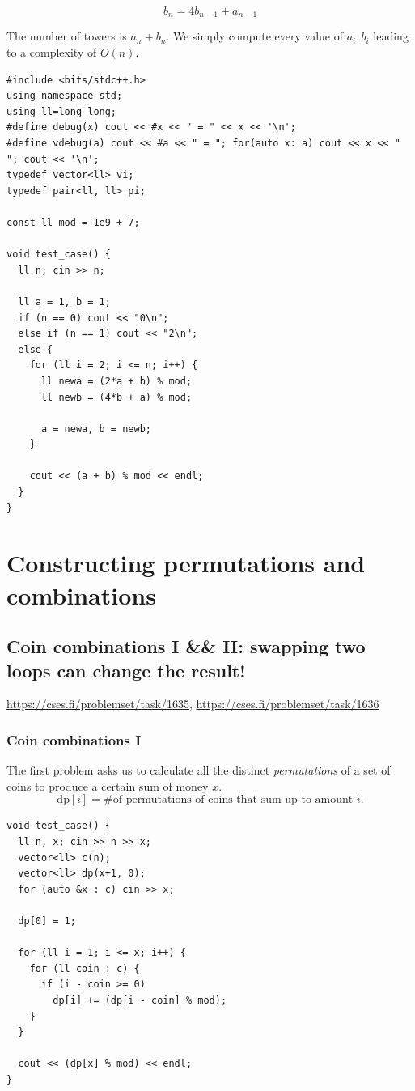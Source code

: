 \begin{equation}
    b_n = 4b_{n-1} + a_{n-1}
\end{equation}

The number of towers is $a_n + b_n$. We simply compute every value of $a_i, b_i$ leading to a complexity of $O(n)$.

\begin{verbatim}
#include <bits/stdc++.h>
using namespace std;
using ll=long long;
#define debug(x) cout << #x << " = " << x << '\n';
#define vdebug(a) cout << #a << " = "; for(auto x: a) cout << x << " "; cout << '\n';
typedef vector<ll> vi;
typedef pair<ll, ll> pi;

const ll mod = 1e9 + 7;

void test_case() {
  ll n; cin >> n; 
  
  ll a = 1, b = 1;
  if (n == 0) cout << "0\n";
  else if (n == 1) cout << "2\n";
  else {
    for (ll i = 2; i <= n; i++) {
      ll newa = (2*a + b) % mod;
      ll newb = (4*b + a) % mod;
  
      a = newa, b = newb;
    }
  
    cout << (a + b) % mod << endl;
  }
}
\end{verbatim}

\section{Constructing permutations and combinations}

\subsection{Coin combinations I \&\& II: swapping two loops can change the result!}
\begin{sloppypar}
\url{https://cses.fi/problemset/task/1635}, \url{https://cses.fi/problemset/task/1636} 
\end{sloppypar}

\subsubsection{Coin combinations I}
The first problem asks us to calculate all the distinct \textit{permutations} of a set of coins to produce a certain sum of money $x$. 
\begin{equation}
    \text{dp}[i] = \text{\# of permutations of coins that sum up to amount } i.
\end{equation}

\begin{verbatim}
void test_case() {
  ll n, x; cin >> n >> x;
  vector<ll> c(n);
  vector<ll> dp(x+1, 0);
  for (auto &x : c) cin >> x;

  dp[0] = 1;

  for (ll i = 1; i <= x; i++) {
    for (ll coin : c) {
      if (i - coin >= 0)
        dp[i] += (dp[i - coin] % mod);
    }
  }
  
  cout << (dp[x] % mod) << endl;
}

\end{verbatim}

